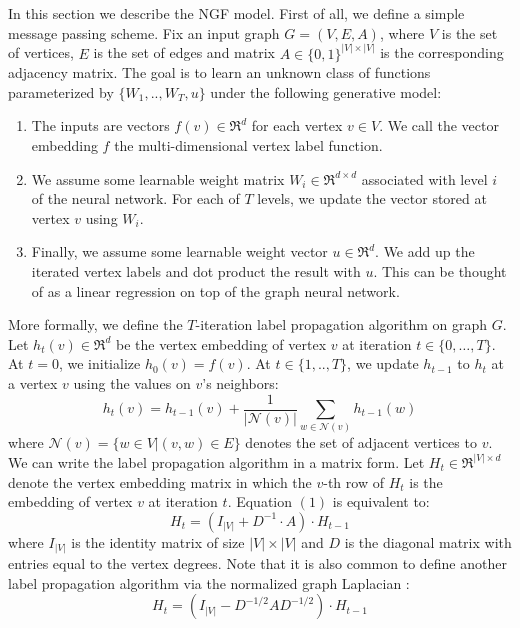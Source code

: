 \documentclass[a4paper]{article}
\begin{document}
In this section we describe the NGF model. First of all, we define a simple message passing scheme. Fix an input graph $G = (V, E, A)$, where $V$ is the set of vertices, $E$ is the set of edges and matrix $A \in \{0, 1\}^{|V| \times |V|}$ is the corresponding adjacency matrix. The goal is to learn an unknown class of functions parameterized by $\{W_1, .., W_T, u\}$ under the following generative model:
\begin{enumerate}
    \item The inputs are vectors $f(v) \in \Re^d$ for each vertex $v \in V$. We call the vector embedding $f$ the multi-dimensional vertex label function.
    \item We assume some learnable weight matrix $W_i \in \Re^{d \times d}$ associated with level $i$ of the neural network. For each of $T$ levels, we update the vector stored at vertex $v$ using $W_i$.
    \item Finally, we assume some learnable weight vector $u \in \Re^d$. We add up the iterated vertex labels and dot product the result with $u$. This can be thought of as a linear regression on top of the graph neural network.
\end{enumerate}
More formally, we define the $T$-iteration label propagation algorithm on graph $G$. Let $h_t(v) \in \Re^d$ be the vertex embedding of vertex $v$ at iteration $t \in \{0, \dots, T\}$. At $t = 0$, we initialize $h_0(v) = f(v)$. At $t \in \{1, .., T\}$, we update $h_{t-1}$ to $h_t$ at a vertex $v$ using the values on $v$'s neighbors:
\begin{equation}
h_t(v) = h_{t - 1}(v) + \frac{1}{|\mathcal{N}(v)|}\sum\limits_{w \in \mathcal{N}(v)} h_{t - 1}(w)
\end{equation}
where $\mathcal{N}(v) = \{w \in V | (v, w) \in E\}$ denotes the set of adjacent vertices to $v$. We can write the label propagation algorithm in a matrix form. Let $H_t \in \Re^{|V| \times d}$ denote the vertex embedding matrix in which the $v$-th row of $H_t$ is the embedding of vertex $v$ at iteration $t$. Equation $(1)$ is equivalent to:
\begin{equation}
H_t = (I_{|V|} + D^{-1} \cdot A) \cdot H_{t - 1}
\end{equation}
where $I_{|V|}$ is the identity matrix of size $|V| \times |V|$ and $D$ is the diagonal matrix with entries equal to the vertex degrees. Note that it is also common to define another label propagation algorithm via the normalized graph Laplacian \cite{Thomas}:
\begin{equation}
H_t = (I_{|V|} - D^{-1/2}AD^{-1/2}) \cdot H_{t - 1}
\end{equation}
\end{document}
